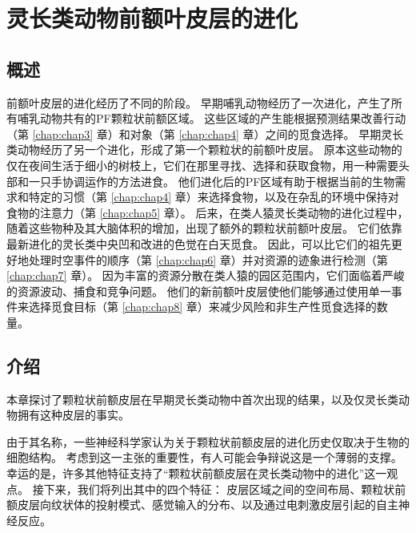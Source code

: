 \chapter{灵长类动物前额叶皮层的进化} \label{chap:chap2}

\section{概述}
前额叶皮层的进化经历了不同的阶段。
早期哺乳动物经历了一次进化，产生了所有哺乳动物共有的PF颗粒状前额区域。
这些区域的产生能根据预测结果改善行动（第 \ref{chap:chap3} 章）和对象（第 \ref{chap:chap4} 章）之间的觅食选择。
早期灵长类动物经历了另一个进化，形成了第一个颗粒状的前额叶皮层。
原本这些动物的仅在夜间生活于细小的树枝上，它们在那里寻找、选择和获取食物，用一种需要头部和一只手协调运作的方法进食。
他们进化后的PF区域有助于根据当前的生物需求和特定的习惯（第 \ref{chap:chap4} 章）来选择食物，以及在杂乱的环境中保持对食物的注意力（第 \ref{chap:chap5} 章）。
后来，在类人猿灵长类动物的进化过程中，随着这些物种及其大脑体积的增加，出现了额外的颗粒状前额叶皮层。
它们依靠最新进化的灵长类中央凹和改进的色觉在白天觅食。
因此，可以比它们的祖先更好地处理时空事件的顺序（第 \ref{chap:chap6} 章）并对资源的迹象进行检测（第 \ref{chap:chap7} 章）。
因为丰富的资源分散在类人猿的园区范围内，它们面临着严峻的资源波动、捕食和竞争问题。
他们的新前额叶皮层使他们能够通过使用单一事件来选择觅食目标（第 \ref{chap:chap8} 章）来减少风险和非生产性觅食选择的数量。



\section{介绍}

本章探讨了颗粒状前额皮层在早期灵长类动物中首次出现的结果，以及仅灵长类动物拥有这种皮层的事实\cite{preuss2007evolutionary}。

由于其名称，一些神经科学家认为关于颗粒状前额皮层的进化历史仅取决于生物的细胞结构。
考虑到这一主张的重要性，有人可能会争辩说这是一个薄弱的支撑。
幸运的是，许多其他特征支持了“颗粒状前额皮层在灵长类动物中的进化”这一观点。
接下来，我们将列出其中的四个特征：
皮层区域之间的空间布局、颗粒状前额皮层向纹状体的投射模式、感觉输入的分布、以及通过电刺激皮层引起的自主神经反应。



